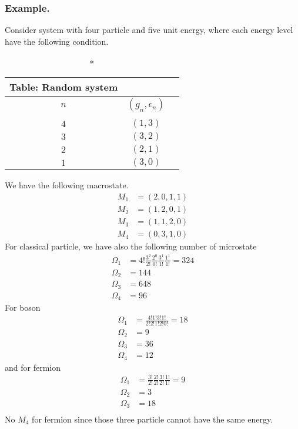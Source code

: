 \documentclass[../../../Main.tex]{subfiles}
\begin{document}
\subsubsection*{Example.} Consider system with four particle and five unit energy, where each energy level have the following condition.
\begin{longtable}{c c c}
    \caption*{Table: Random system}\\
    \hline
    $n$ & $(g_n,\epsilon_n)$\\ 
    \hline\\

    $4$&$(1,3)$\\
    $3$&$(3,2)$\\
    $2$&$(2,1)$\\
    $1$&$(3,0)$\\
\end{longtable}
We have the following macrostate.
\begin{align*}
    M_1&=(2,0,1,1)\\
    M_2&=(1,2,0,1)\\
    M_3&=(1,1,2,0)\\
    M_4&=(0,3,1,0)
\end{align*}
For classical particle, we have also the following number of microstate
\begin{align*}
    \Omega_1&=4!\frac{3^2}{2!}\frac{2^0}{0!}\frac{3^1}{1!}\frac{1^1}{1!}=324\\
    \Omega_2&=144\\
    \Omega_3&=648\\
    \Omega_4&=96
\end{align*}
For boson 
\begin{align*}
    \Omega_1&=\frac{4!1!3!1!}{2!2!1!2!0!}=18\\
    \Omega_2&=9\\
    \Omega_3&=36\\
    \Omega_4&=12
\end{align*}
and for fermion
\begin{align*}
    \Omega_1&=\frac{3!}{2!}\frac{2!}{2!}\frac{3!}{2!}\frac{1!}{1!}=9\\
    \Omega_2&=3\\
    \Omega_3&=18\\
\end{align*}
No $M_4$ for fermion since those three particle cannot have the same energy. 
\end{document}
